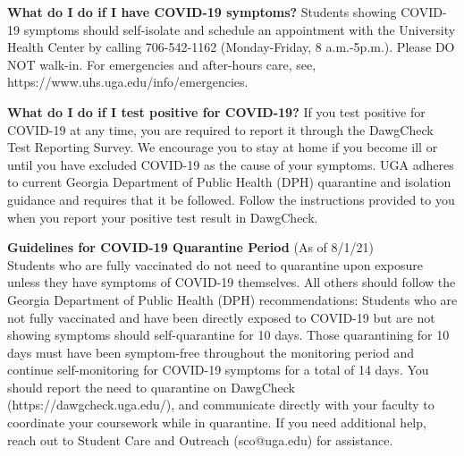 \documentclass[12pt]{article}
\begin{document}
{\bf What do I do if I have COVID-19 symptoms?}
Students showing COVID-19 symptoms should self-isolate and schedule an
appointment with the University Health Center by calling 706-542-1162
(Monday-Friday, 8 a.m.-5p.m.). Please DO NOT walk-in. For emergencies
and after-hours care, see, https://www.uhs.uga.edu/info/emergencies.

{\bf What do I do if I test positive for COVID-19?}
If you test positive for COVID-19 at any time, you are required to
report it through the DawgCheck Test Reporting Survey. We encourage
you to stay at home if you become ill or until you have excluded
COVID-19 as the cause of your symptoms. UGA adheres to current Georgia
Department of Public Health (DPH) quarantine and isolation guidance
and requires that it be followed. Follow the instructions provided to
you when you report your positive test result in DawgCheck.

{\bf Guidelines for COVID-19 Quarantine Period} (As of 8/1/21) \\
Students who are fully vaccinated do not need to quarantine upon
exposure unless they have symptoms of COVID-19 themselves. All others
should follow the Georgia Department of Public Health (DPH)
recommendations: Students who are not fully vaccinated and have been
directly exposed to COVID-19 but are not showing symptoms should
self-quarantine for 10 days. Those quarantining for 10 days must have
been symptom-free throughout the monitoring period and continue
self-monitoring for COVID-19 symptoms for a total of 14 days. You
should report the need to quarantine on DawgCheck
(https://dawgcheck.uga.edu/), and communicate directly with your
faculty to coordinate your coursework while in quarantine. If you need
additional help, reach out to Student Care and Outreach (sco@uga.edu)
for assistance. 
\end{document}
